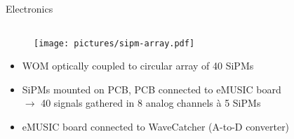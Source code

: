 \documentclass[aspectratio=169]{beamer}
\begin{document}
	
	
%				
%			
%				


	
	
	\begin{frame}{Electronics}
		\vspace{-1cm}
		\begin{columns}
			
			
			
			
			\begin{column}{0.8\textwidth}
				\begin{figure}
					\centering
					\texttt{[image: pictures/sipm-array.pdf]}
				\end{figure}
			
				\begin{itemize}
					\item WOM optically coupled to circular array of 40 SiPMs
					\item SiPMs mounted on PCB, PCB connected to eMUSIC board \\ $\rightarrow$ 40 signals gathered in 8 analog channels à 5 SiPMs
					\item eMUSIC board connected to WaveCatcher (A-to-D converter)
				\end{itemize}
			
			\end{column}
			
			
			
			
			
		\end{columns}
	
	\end{frame}
	
\end{document}
